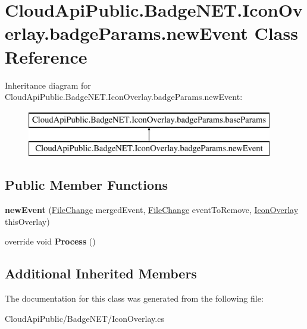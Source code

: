 \hypertarget{class_cloud_api_public_1_1_badge_n_e_t_1_1_icon_overlay_1_1badge_params_1_1new_event}{\section{Cloud\-Api\-Public.\-Badge\-N\-E\-T.\-Icon\-Overlay.\-badge\-Params.\-new\-Event Class Reference}
\label{class_cloud_api_public_1_1_badge_n_e_t_1_1_icon_overlay_1_1badge_params_1_1new_event}
}
Inheritance diagram for Cloud\-Api\-Public.\-Badge\-N\-E\-T.\-Icon\-Overlay.\-badge\-Params.\-new\-Event\-:\begin{figure}[H]
\begin{center}
\leavevmode
\includegraphics[height=2.000000cm]{class_cloud_api_public_1_1_badge_n_e_t_1_1_icon_overlay_1_1badge_params_1_1new_event}
\end{center}
\end{figure}
\subsection*{Public Member Functions}
\begin{DoxyCompactItemize}
\item 
\hypertarget{class_cloud_api_public_1_1_badge_n_e_t_1_1_icon_overlay_1_1badge_params_1_1new_event_ad7c4cc8e67d687ba85bbbba6dee272ae}{{\bfseries new\-Event} (\hyperlink{class_cloud_api_public_1_1_model_1_1_file_change}{File\-Change} merged\-Event, \hyperlink{class_cloud_api_public_1_1_model_1_1_file_change}{File\-Change} event\-To\-Remove, \hyperlink{class_cloud_api_public_1_1_badge_n_e_t_1_1_icon_overlay}{Icon\-Overlay} this\-Overlay)}\label{class_cloud_api_public_1_1_badge_n_e_t_1_1_icon_overlay_1_1badge_params_1_1new_event_ad7c4cc8e67d687ba85bbbba6dee272ae}

\item 
\hypertarget{class_cloud_api_public_1_1_badge_n_e_t_1_1_icon_overlay_1_1badge_params_1_1new_event_af4f277b3f96ca7e5e8add4b0d208cb25}{override void {\bfseries Process} ()}\label{class_cloud_api_public_1_1_badge_n_e_t_1_1_icon_overlay_1_1badge_params_1_1new_event_af4f277b3f96ca7e5e8add4b0d208cb25}

\end{DoxyCompactItemize}
\subsection*{Additional Inherited Members}


The documentation for this class was generated from the following file\-:\begin{DoxyCompactItemize}
\item 
Cloud\-Api\-Public/\-Badge\-N\-E\-T/Icon\-Overlay.\-cs\end{DoxyCompactItemize}
